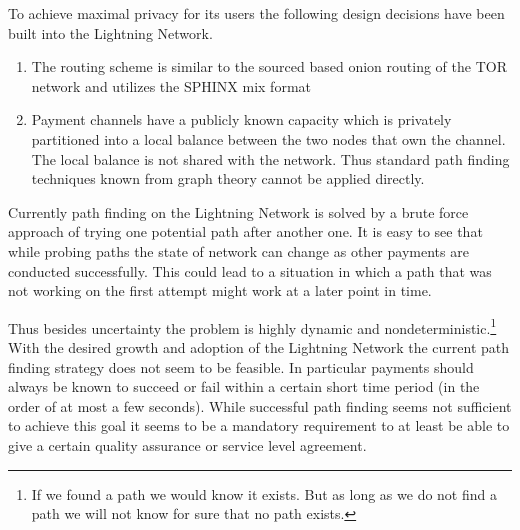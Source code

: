 \documentclass[a4paper]{paper}
\begin{document}
To achieve maximal privacy for its users the following design decisions have been built into the Lightning Network.
\begin{enumerate}
\item The routing scheme is similar to the sourced based onion routing of the TOR network and utilizes the SPHINX mix format \cite{danezis2009sphinx}
\item Payment channels have a publicly known capacity which is privately partitioned into a local balance between the two nodes that own the channel. The local balance is not shared with the network. Thus standard path finding techniques known from graph theory cannot be applied directly.
\end{enumerate}

Currently path finding on the Lightning Network is solved by a brute force approach of trying one potential path after another one.
It is easy to see that while probing paths the state of network can change as other payments are conducted successfully.
This could lead to a situation in which a path that was not working on the first attempt might work at a later point in time.

Thus besides uncertainty the problem is highly dynamic and nondeterministic.\footnote{If we found a path we would know it exists. But as long as we do not find a path we will not know for sure that no path exists.}
With the desired growth and adoption of the Lightning Network the current path finding strategy does not seem to be feasible.
In particular payments should always be known to succeed or fail within a certain short time period (in the order of at most a few seconds).
While successful path finding seems not sufficient to achieve this goal it seems to be a mandatory requirement to at least be able to give a certain quality assurance or service level agreement.
\end{document}
